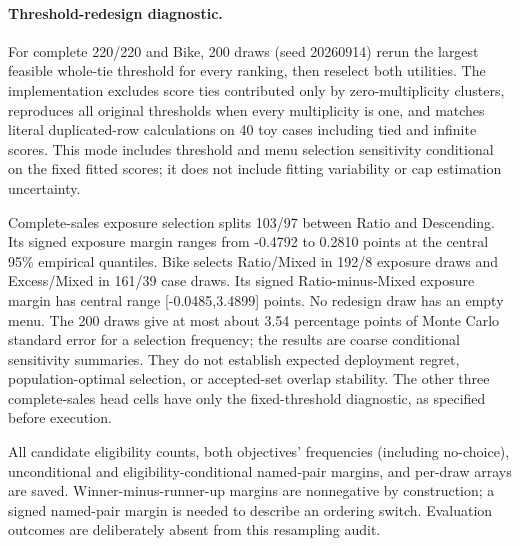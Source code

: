 \paragraph{Threshold-redesign diagnostic.}
For complete 220/220 and Bike, 200 draws (seed 20260914) rerun the largest feasible whole-tie threshold for every ranking, then reselect both utilities. The implementation excludes score ties contributed only by zero-multiplicity clusters, reproduces all original thresholds when every multiplicity is one, and matches literal duplicated-row calculations on 40 toy cases including tied and infinite scores. This mode includes threshold and menu selection sensitivity conditional on the fixed fitted scores; it does not include fitting variability or cap estimation uncertainty.

Complete-sales exposure selection splits 103/97 between Ratio and Descending. Its signed exposure margin ranges from -0.4792 to 0.2810 points at the central 95\% empirical quantiles. Bike selects Ratio/Mixed in 192/8 exposure draws and Excess/Mixed in 161/39 case draws. Its signed Ratio-minus-Mixed exposure margin has central range [-0.0485,3.4899] points. No redesign draw has an empty menu. The 200 draws give at most about 3.54 percentage points of Monte Carlo standard error for a selection frequency; the results are coarse conditional sensitivity summaries. They do not establish expected deployment regret, population-optimal selection, or accepted-set overlap stability. The other three complete-sales head cells have only the fixed-threshold diagnostic, as specified before execution.


All candidate eligibility counts, both objectives' frequencies (including no-choice), unconditional and eligibility-conditional named-pair margins, and per-draw arrays are saved. Winner-minus-runner-up margins are nonnegative by construction; a signed named-pair margin is needed to describe an ordering switch. Evaluation outcomes are deliberately absent from this resampling audit.

\FloatBarrier
